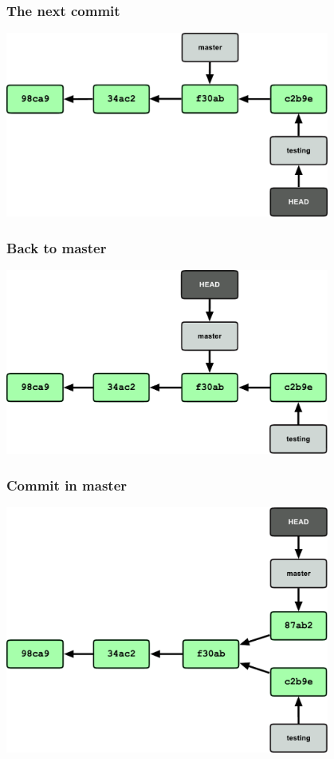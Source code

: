 \documentclass{gittalk}
\begin{document}
\begin{frame}
  \frametitle{The next commit}
\begin{center}
  \includegraphics[width=0.8\textwidth]{./img/fig0307.pdf}
\end{center}
\end{frame}

\begin{frame}
  \frametitle{Back to master}
\begin{center}
  \includegraphics[width=0.8\textwidth]{./img/fig0308.pdf}
\end{center}
\end{frame}

\begin{frame}
  \frametitle{Commit in master}
\begin{center}
  \includegraphics[width=0.8\textwidth]{./img/fig0309.pdf}
\end{center}
\end{frame}
\end{document}
